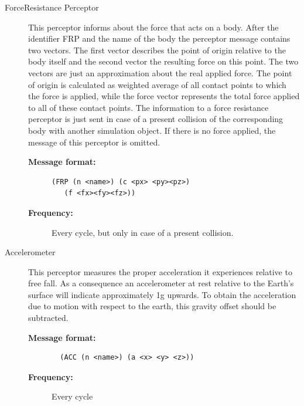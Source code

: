 \begin{description}
  \item [ForceResistance Perceptor]
  This perceptor informs about the force that acts on a body. After the identifier FRP and the name of the body the perceptor message contains two vectors. The first vector describes the point of origin relative to the body itself and the second vector the resulting force on this point. The two vectors are just an approximation about the real applied force. The point of origin is calculated as weighted average of all contact points to which the force is applied, while the force vector represents the total force applied to all of these contact points. The information to a force resistance perceptor is just sent in case of a present collision of the corresponding body with another simulation object. If there is no force applied, the message of this perceptor is omitted.
 \begin{description}
  \item[{\bf Message format:}]
  \begin{verbatim}(FRP (n <name>) (c <px> <py><pz>)
   (f <fx><fy><fz>))
  \end{verbatim}
  \item[{\bf Frequency:}]
  Every cycle, but only in case of a present    		collision.
  \end{description}




  \item [Accelerometer]
  This perceptor measures the proper acceleration it experiences relative to free fall. As a consequence an accelerometer at rest relative to the Earth's surface will indicate approximately 1g upwards. To obtain the acceleration due to motion with respect to the earth, this gravity offset should be subtracted.
    \begin{description}
  \item[{\bf Message format:}]
  \begin{verbatim}
  (ACC (n <name>) (a <x> <y> <z>))
  \end{verbatim}
  \item[{\bf Frequency:}]
  Every cycle
  \end{description}
\end{description}

